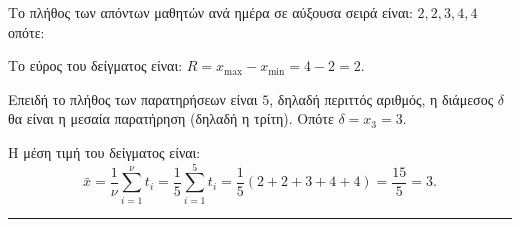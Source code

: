 Το πλήθος των απόντων μαθητών ανά ημέρα σε αύξουσα σειρά είναι: $2, 2, 3, 4, 4$
οπότε:
\begin{alist}
\item Το εύρος του δείγματος είναι: $R = x_{\max} - x_{\min} = 4 - 2 = 2$.

\item Επειδή το πλήθος των παρατηρήσεων είναι $5$, δηλαδή περιττός αριθμός, η διάμεσος $\delta$ θα είναι η μεσαία παρατήρηση (δηλαδή η τρίτη). Οπότε $\delta = x_3 = 3$.

\item Η μέση τιμή του δείγματος είναι:
\[
\bar{x} = \frac{1}{\nu}\sum_{i=1}^{\nu} t_i = \frac{1}{5}\sum_{i=1}^{5} t_i = \frac{1}{5}(2+2+3+4+4) = \frac{15}{5} = 3.
\]
\end{alist}
\vspace{6mm}
\noindent\rule{\textwidth}{0.4pt}
\vspace{6mm}

